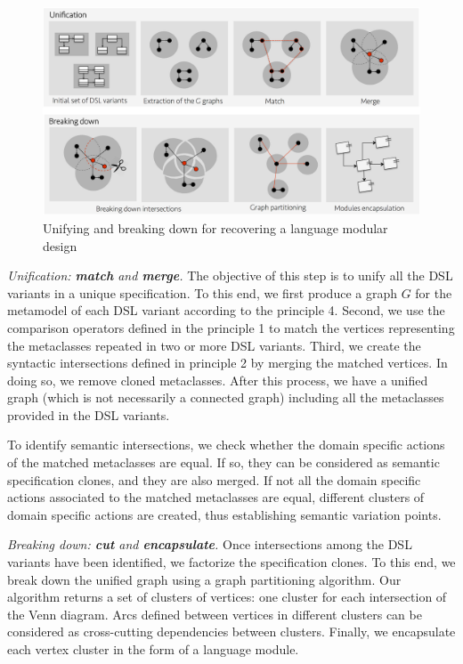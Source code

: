 \begin{figure}
\centering
\includegraphics[width=1\linewidth]{images/fig-reverse-engineering-detailed.png}
\caption{Unifying and breaking down for recovering a language modular design}
\label{fig:breakingdown}
\end{figure}

\vspace{2mm}
\textit{Unification: \textbf{match} and \textbf{merge}.} The objective of this step is to unify all the DSL variants in a unique specification. To this end, we first produce a graph $G$ for the metamodel of each DSL variant according to the principle 4. Second, we use the comparison operators defined in the principle 1 to match the vertices representing the metaclasses repeated in two or more DSL variants. Third, we create the syntactic intersections defined in principle 2 by merging the matched vertices. In doing so, we remove cloned metaclasses. After this process, we have a unified graph (which is not necessarily a connected graph) including all the metaclasses provided in the DSL variants. 

To identify semantic intersections, we check whether the domain specific actions of the matched metaclasses are equal. If so, they can be considered as semantic specification clones, and they are also merged. If not all the domain specific actions associated to the matched metaclasses are equal, different clusters of domain specific actions are created, thus establishing semantic variation points.

\vspace{2mm}
\textit{Breaking down: \textbf{cut} and \textbf{encapsulate}.} Once intersections among the DSL variants have been identified, we factorize the specification clones. To this end, we break down the unified graph using a graph partitioning algorithm. Our algorithm returns a set of clusters of vertices: one cluster for each intersection of the Venn diagram. Arcs defined between vertices in different clusters can be considered as cross-cutting dependencies between clusters. Finally, we encapsulate each vertex cluster in the form of a language module. 

